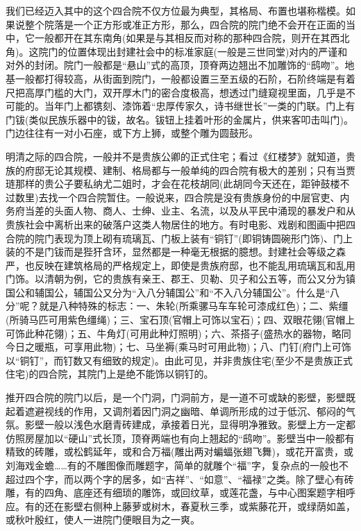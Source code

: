 \par 我们已经迈入其中的这个四合院不仅方位最为典型，其格局、布置也堪称楷模。如果说整个院落是一个正方形或准正方形，那么，四合院的院门绝不会开在正面的当中，它一般都开在其东南角(如果是与其相反而对称的那种四合院，则开在其西北角)。这院门的位置体现出封建社会中的标准家庭(一般是三世同堂)对内的严谨和对外的封闭。院门一般都是“悬山”式的高顶，顶脊两边翘出不加雕饰的“鸱吻”。地基一般都打得较高，从街面到院门，一般都设置三至五级的石阶，石阶终端是有着尺把高厚门槛的大门，双开厚木门的密合度极高，想透过门缝窥视里面，几乎是不可能的。当年门上都镌刻、漆饰着“忠厚传家久，诗书继世长”一类的门联。门上有门钹(类似民族乐器中的钹，故名。钹钮上挂着叶形的金属片，供来客叩击叫门)。门边往往有一对小石座，或下方上狮，或整个雕为圆鼓形。
\par 明清之际的四合院，一般并不是贵族公卿的正式住宅；看过《红楼梦》就知道，贵族的府邸无论其规模、建制、格局都与一般单纯的四合院有极大的差别；只有当贾琏那样的贵公子要私纳尤二姐时，才会在花枝胡同(此胡同今天还在，距钟鼓楼不过数里)去找一个四合院暂住。一般说来，四合院是没有贵族身份的中层官吏、内务府当差的头面人物、商人、士绅、业主、名流，以及从平民中涌现的暴发户和从贵族社会中离析出来的破落户这类人物居住的地方。有时电影、戏剧和图画中把四合院的院门表现为顶上砌有琉璃瓦、门板上装有“铜钉”(即铜铸圆碗形门饰)、门上装的不是门钹而是狴犴含环，显然都是一种毫无根据的臆想。封建社会等级之森严，也反映在建筑格局的严格规定上，即使是贵族府邸，也不能乱用琉璃瓦和乱用门饰。以清朝为例，它的贵族有亲王、郡王、贝勒、贝子和公五等，而公又分为镇国公和辅国公，辅国公又分为“入八分辅国公”和“不入八分辅国公”。什么是“八分”呢？就是八种特殊的标志：一、朱轮(所乘骡马车车轮可漆成红色)；二、紫缰(所骑马匹可用紫色缰绳)；三、宝石顶(官帽上可饰以宝石)；四、双眼花翎(官帽上可饰此种花翎)；五、牛角灯(可用此种灯照明)；六、茶搭子(盛热水的器物，略同今日之暖瓶，可享用此物)；七、马坐褥(乘马时可用此物)；八、门钉(府门上可饰以“铜钉”，而钉数又有细致的规定)。由此可见，并非贵族住宅(至少不是贵族正式住宅)的四合院，其院门上是绝不能饰以铜钉的。
\par 推开四合院的院门以后，是一个门洞，门洞前方，是一道不可或缺的影壁，影壁既起着遮避视线的作用，又调剂着因门洞之幽暗、单调所形成的过于低沉、郁闷的气氛。影壁一般以浅色水磨青砖建成，承接着日光，显得明净雅致。影壁上方一定都仿照房屋加以“硬山”式长顶，顶脊两端也有向上翘起的“鸱吻”。影壁当中一般都有精致的砖雕，或松鹤延年，或和合万福(雕出两对蝙蝠张翅飞舞)，或花开富贵，或刘海戏金蟾……有的不雕图像而雕题字，简单的就雕个“福”字，复杂点的一般也不超过四个字，而以两个字的居多，如“吉祥”、“如意”、“福禄”之类。除了壁心有砖雕，有的四角、底座还有细琐的雕饰，或回纹草，或莲花盏，与中心图案题字相呼应。有的还在影壁右侧种上藤萝或树木，春夏秋三季，或紫藤花开，或绿荫如盖，或秋叶殷红，使人一进院门便眼目为之一爽。
